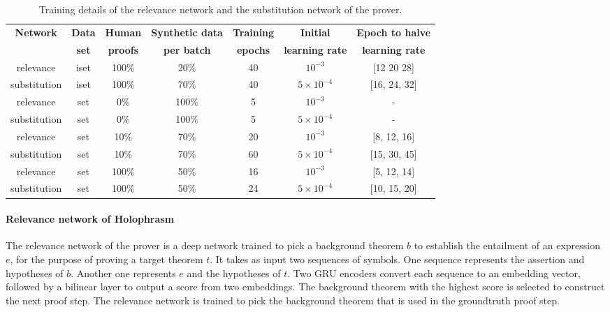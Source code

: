 \documentclass{article}
\begin{document}
\begin{table*}[t]
\caption{Training details of the relevance network and the substitution network of the prover.}
\label{tab:hyper}
\vskip 0.1in
\begin{center}
\begin{small}
\begin{sc}
\begin{tabular}{c c c c c c c}
\toprule
\multicolumn{1}{c}{\bf Network  } 
&\multicolumn{1}{c}{\bf Data  } 
&\multicolumn{1}{c}{\bf Human  } 
&\multicolumn{1}{c}{\bf Synthetic data}
&\multicolumn{1}{c}{\bf Training  } 
&\multicolumn{1}{c}{\bf Initial }
&\multicolumn{1}{c}{\bf Epoch to halve } \\
\multicolumn{1}{c}{\bf   } 
&\multicolumn{1}{c}{\bf set  }
&\multicolumn{1}{c}{\bf proofs } 
&\multicolumn{1}{c}{\bf per batch}
&\multicolumn{1}{c}{\bf  epochs } 
&\multicolumn{1}{c}{\bf learning rate}
&\multicolumn{1}{c}{\bf learning rate }
\\ \midrule
relevance & iset & 100\% & 20\% & 40 &  $10^{-3}$ & [12 20 28] \\
substitution & iset & 100\% & 70\% & 40 &  $5\times10^{-4}$ & [16, 24, 32] \\ \midrule
relevance & set & 0\% & 100\% & 5 &  $10^{-3}$ & - \\
substitution & set & 0\% & 100\% & 5 &  $5\times10^{-4}$ & - \\ \midrule
relevance & set & 10\% & 70\% & 20 &  $10^{-3}$ & [8, 12, 16] \\
substitution & set & 10\% & 70\% & 60 &  $5\times10^{-4}$ & [15, 30, 45] \\ \midrule
relevance & set & 100\% & 50\% & 16 &  $10^{-3}$ & [5, 12, 14] \\
substitution & set & 100\% & 50\% & 24 &  $5\times10^{-4}$ & [10, 15, 20] \\
\bottomrule
\end{tabular}
\end{sc}
\end{small}
\end{center}
\vskip -0.175in
\end{table*}


\paragraph{Relevance network of Holophrasm}
The relevance network of the prover is a deep network trained to pick a background theorem $b$ to establish the entailment of an expression $e$, for the purpose of proving a target theorem $t$.
It takes as input two sequences of symbols.
One sequence represents the assertion and hypotheses of $b$.
Another one represents $e$ and the hypotheses of $t$.
Two GRU encoders convert each sequence to an embedding vector,
followed by a bilinear layer
to output a score from two embeddings.
The background theorem with the highest score is selected to construct the next proof step. 
The relevance network 
is trained to pick the
background theorem that is used in the groundtruth proof step.
\end{document}
